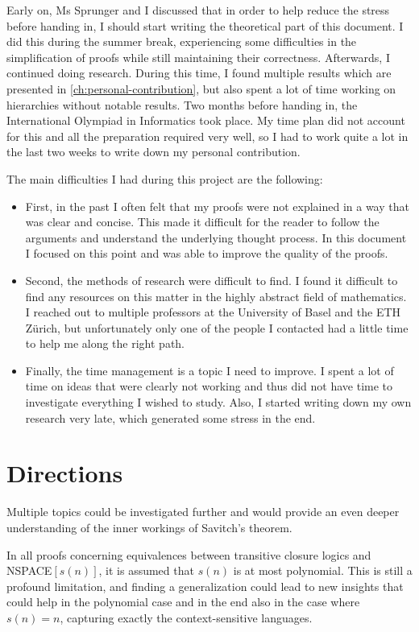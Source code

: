 Early on, Ms Sprunger and I discussed that in order to help reduce the stress before handing in, I should start writing the theoretical part of this document.
I did this during the summer break, experiencing some difficulties in the simplification of proofs while still maintaining their correctness.
Afterwards, I continued doing research.
During this time, I found multiple results which are presented in \cref{ch:personal-contribution}, but also spent a lot of time working on hierarchies without notable results.
Two months before handing in, the International Olympiad in Informatics took place.
My time plan did not account for this and all the preparation required very well, so I had to work quite a lot in the last two weeks to write down my personal contribution.

The main difficulties I had during this project are the following:
\begin{itemize}
    \setlength\itemsep{0.15em}
    \item First, in the past I often felt that my proofs were not explained in a way that was clear and concise.
    This made it difficult for the reader to follow the arguments and understand the underlying thought process.
    In this document I focused on this point and was able to improve the quality of the proofs.
    \item Second, the methods of research were difficult to find.
    I found it difficult to find any resources on this matter in the highly abstract field of mathematics.
    I reached out to multiple professors at the University of Basel and the ETH Zürich, but unfortunately only one of the people I contacted had a little time to help me along the right path.
    \item Finally, the time management is a topic I need to improve.
    I spent a lot of time on ideas that were clearly not working and thus did not have time to investigate everything I wished to study.
    Also, I started writing down my own research very late, which generated some stress in the end.
\end{itemize}

\section{Directions}\label{sec:directions}
Multiple topics could be investigated further and would provide an even deeper understanding of the inner workings of Savitch's theorem.

In all proofs concerning equivalences between transitive closure logics and \acs{NSPACE}$[s(n)]$, it is assumed that $s(n)$ is at most polynomial.
This is still a profound limitation, and finding a generalization could lead to new insights that could help in the polynomial case and in the end also in the case where $s(n) = n$, capturing exactly the context-sensitive languages.

